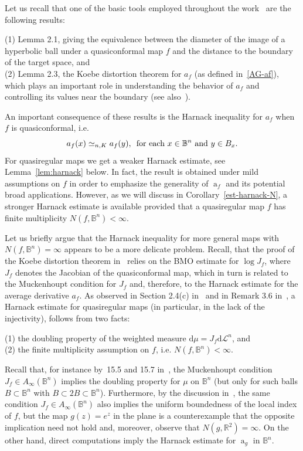 \documentclass[11pt,a4paper,reqno]{amsart}
\theoremstyle{definition}
\renewcommand{\a}{\operatorname{a}}
\newcommand{\B}{\mathbb{B}^n}
\newcommand{\R}{\mathbb{R}}
\newcommand{\ud}{\mathrm {d}}
\numberwithin{komcounter}{section}
\begin{document}
\noindent Let us recall that one of the basic tools employed throughout the work~\cite{ak} are the following results:
\smallskip

\noindent (1) Lemma 2.1, giving the equivalence between the diameter of the image of a hyperbolic ball under a quasiconformal map $f$ and the distance to the boundary of the target space, and \\
(2) Lemma 2.3, the Koebe distortion theorem for $a_f$ (as defined in~\eqref{AG-af}), which plays an important role in understanding the behavior of $a_f$ and controlling its values near the boundary (see also~\cite[Theorem 1.8]{asge1}). 
\smallskip

An important consequence of these results is the Harnack inequality for $a_f$ when $f$ is quasiconformal, i.e.
\[
a_f(x)\simeq_{n, K} a_f(y),\,\hbox{ for each } x\in \B \hbox{ and } y\in B_x.
\]
For quasiregular maps we get a weaker Harnack estimate, see Lemma~\ref{lem:harnack} below. In fact, the result is obtained under mild assumptions on $f$ in order to emphasize the generality of $\a_f$ and its potential broad applications. However, as we will discuss in Corollary~\ref{est-harnack-N}, a stronger Harnack estimate is available provided that a quasiregular map $f$ has finite multiplicity $N(f,\B)<\infty$.  

Let us briefly argue that the Harnack inequality for more general maps with $N(f,\B)=\infty$ appears to be a more delicate problem. Recall, that the proof of the Koebe distortion theorem in~\cite{asge1} relies on the BMO estimate for $\log J_f$, where $J_f$ denotes the Jacobian of the quasiconformal map, which in turn is related to the Muckenhoupt condition for $J_f$ and, therefore, to the Harnack estimate for the average derivative $a_f$. As observed in Section 2.4(c) in~\cite{bkr} and in Remark 3.6 in~\cite{hk}, a Harnack estimate for quasiregular maps (in particular, in the lack of the injectivity), follows from two facts:

(1) the doubling property of the weighted measure $\ud\mu=J_f\ud\mathcal{L}^n$, and \\
\indent(2) the finite multiplicity assumption on $f$, i.e. $N(f,\B)<\infty$.

Recall that, for instance by~15.5 and 15.7 in~\cite{hkm}, the Muckenhoupt condition $J_f\in A_{\infty}(\B)$ implies the doubling property for $\mu$ on $\B$ (but only for such balls $B\subset \B$ with $B\subset 2B\subset \B$).  Furthermore, by the discussion in~\cite[Remark 3.6(b)]{hk}, the same condition $J_f\in A_\infty(\B)$ also implies the uniform boundedness of the local index of $f$, but the map $g(z)=e^z$ in the plane is a counterexample that the opposite implication need not hold and, moreover, observe that $N(g,\R^2)=\infty$. On the other hand, direct computations imply the Harnack estimate for $\a_g$ in $\B$.
\end{document}
